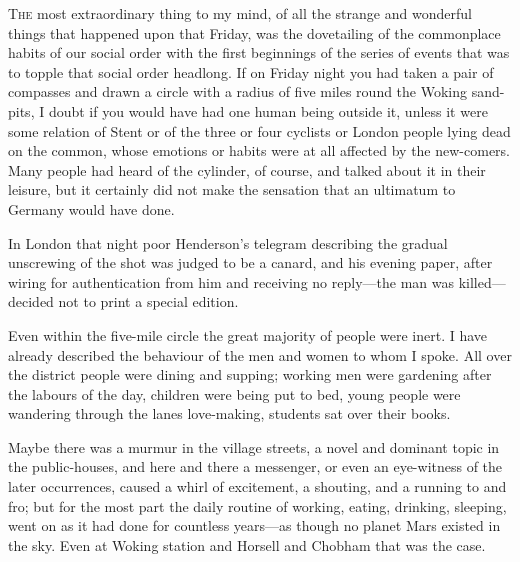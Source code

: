 


\lettrine[lines=4]{T}{he} most extraordinary thing to my mind, of all the strange and wonderful things that happened upon that Friday, was the dovetailing of the commonplace habits of our social order with the first beginnings of the series of events that was to topple that social order headlong. If on Friday night you had taken a pair of compasses and drawn a circle with a radius of five miles round the Woking sand-pits, I doubt if you would have had one human being outside it, unless it were some relation of Stent or of the three or four cyclists or London people lying dead on the common, whose emotions or habits were at all affected by the new-comers. Many people had heard of the cylinder, of course, and talked about it in their leisure, but it certainly did not make the sensation that an ultimatum to Germany would have done.

In London that night poor Henderson's telegram describing the gradual unscrewing of the shot was judged to be a canard, and his evening paper, after wiring for authentication from him and receiving no reply—the man was killed—decided not to print a special edition.

Even within the five-mile circle the great majority of people were inert. I have already described the behaviour of the men and women to whom I spoke. All over the district people were dining and supping; working men were gardening after the labours of the day, children were being put to bed, young people were wandering through the lanes love-making, students sat over their books.

Maybe there was a murmur in the village streets, a novel and dominant topic in the public-houses, and here and there a messenger, or even an eye-witness of the later occurrences, caused a whirl of excitement, a shouting, and a running to and fro; but for the most part the daily routine of working, eating, drinking, sleeping, went on as it had done for countless years—as though no planet Mars existed in the sky. Even at Woking station and Horsell and Chobham that was the case.

